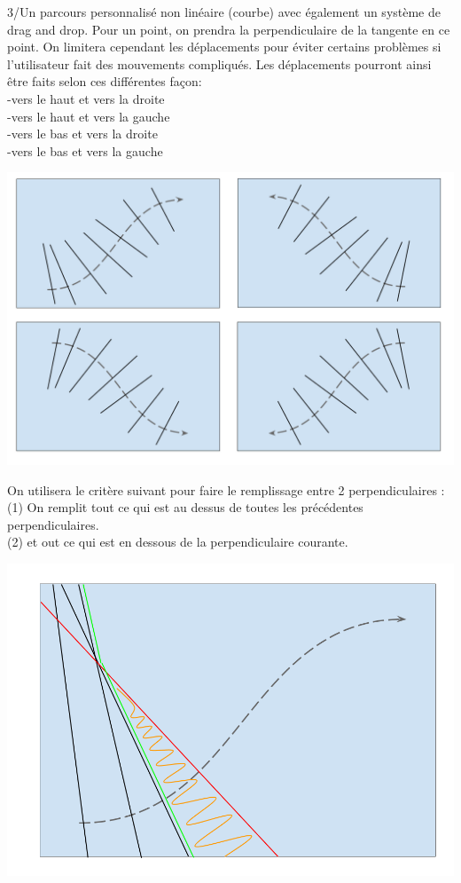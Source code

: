 \documentclass[a4paper,12pt]{report}
\begin{document}
3/Un parcours personnalisé non linéaire (courbe) avec également un système de drag and drop. Pour un point, on prendra la perpendiculaire de la tangente en ce point.
On limitera cependant les déplacements pour éviter certains problèmes si l’utilisateur fait des mouvements compliqués.
Les déplacements pourront ainsi être faits selon ces différentes façon:
\\\indent -vers le haut et vers la droite
\\\indent -vers le haut et vers la gauche 
\\\indent -vers le bas et vers la droite
\\\indent -vers le bas et vers la gauche
\begin{center}
 \includegraphics[scale=0.2]{./obturateur3.png}
\end{center}
On utilisera le critère suivant pour faire le remplissage entre 2 perpendiculaires :
\\\indent (1) On remplit tout ce qui est au dessus de toutes les précédentes perpendiculaires.
\\\indent (2) et out ce qui est en dessous de la perpendiculaire courante.
\begin{center}
 \includegraphics[scale=0.2]{./obturateur3exp.png}
\end{center}\par\bigskip
\end{document}
